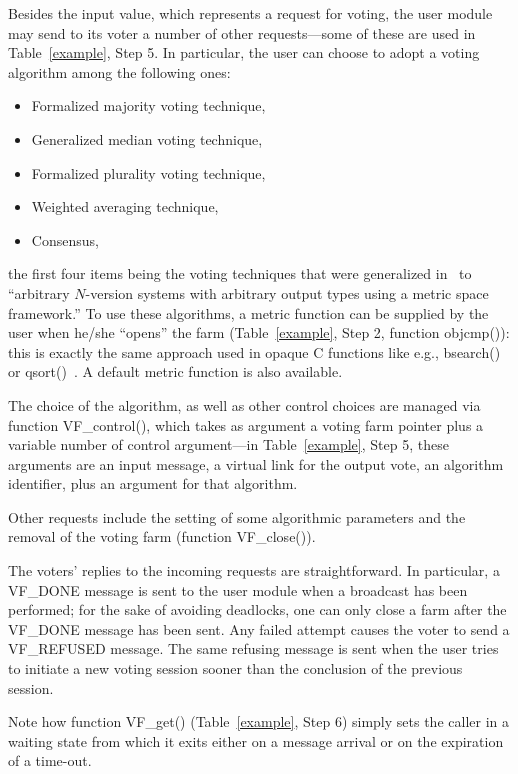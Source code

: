\documentclass[11pt]{article}
\begin{document}
Besides the input value, which represents a request for voting,
the user module may send to its voter a number of other requests---some 
of these are used in Table~\ref{example}, Step 5. In particular, the user
can choose to adopt a voting algorithm among the following ones:
\begin{itemize}
\item Formalized majority voting technique,
\item Generalized median voting technique,
\item Formalized plurality voting technique,
\item Weighted averaging technique,
\item Consensus,
\end{itemize}
the first four items being the voting techniques that were generalized in~\cite{LoCE89}
to ``arbitrary $N\!$-version systems with arbitrary output types 
using a metric space framework.''
To use these algorithms, a metric function can be supplied by the
user when he/she ``opens'' the farm (Table~\ref{example}, Step 2, function {\sf objcmp()}):
this is exactly the same approach used in opaque C functions like
e.g., {\sf bsearch()} or {\sf qsort()}~\cite{KeRi2}.
A default metric function is also available.

The choice of the algorithm, as well as other control choices are managed via function
{\sf VF\_control()}, which takes as argument a voting farm pointer plus a variable number
of control argument---in Table~\ref{example}, Step 5, these arguments are
an input message, a virtual link for the output vote, an algorithm identifier, plus
an argument for that algorithm.


Other requests include the setting of some algorithmic parameters
and the removal of the voting farm (function {\sf VF\_close()}).



The voters' replies to the incoming requests are straightforward. In particular,
a {\sf VF\_DO\-NE} message is sent to the user module when a broadcast
has been performed; for the sake of avoiding deadlocks, one can only
close a farm after the {\sf VF\_DONE} message
has been sent.
Any failed attempt causes the voter to send a {\sf VF\_REFUSED}
message.
The same refusing message is sent when the user tries to
initiate a new voting session sooner than the conclusion of the previous session.

Note how function {\sf VF\_get()} (Table~\ref{example}, Step 6)
simply sets the caller in a waiting state from which it exits either on a
message arrival or on the expiration of a time-out.
\end{document}
